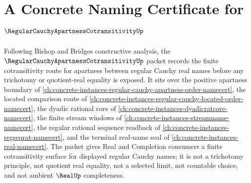 \chapter{A Concrete Naming Certificate for $\RegularCauchyApartnessCotransitivityUp$}
\label{ch:concrete-instances-regular-cauchy-apartness-cotransitivity-namecert}

Following Bishop and Bridges constructive analysis, the $\RegularCauchyApartnessCotransitivityUp$ packet records the finite cotransitivity route for apartness between regular Cauchy real names before any trichotomy or quotient-real equality is exposed. It sits over the positive apartness boundary of \autoref{ch:concrete-instances-regular-cauchy-apartness-order-namecert}, the located comparison route of \autoref{ch:concrete-instances-regular-cauchy-located-order-namecert}, the dyadic rational core of \autoref{ch:concrete-instances-dyadicratcore-namecert}, the finite stream windows of \autoref{ch:concrete-instances-streamname-namecert}, the regular rational sequence readback of \autoref{ch:concrete-instances-regseqrat-namecert}, and the terminal real-name seal of \autoref{ch:concrete-instances-real-namecert}. The packet gives Real and Completion consumers a finite cotransitivity surface for displayed regular Cauchy names; it is not a trichotomy principle, not quotient real equality, not a selected limit, not countable choice, and not ambient $\RealUp$ completeness.

